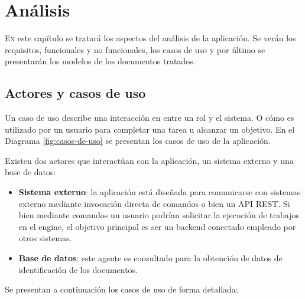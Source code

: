 
\chapter{Análisis}
\label{chap:analisis}

\lettrine{E}{n} este capítulo se tratará los aspectos del análisis de la aplicación. Se verán los requisitos, funcionales y no funcionales, los casos de uso y por último se presentarán los modelos de los documentos tratados.

\section{Actores y casos de uso}

Un caso de uso describe una interacción en entre un rol y el sistema. O cómo es utilizado por un usuario para completar una tarea u alcanzar un objetivo. En el Diagrama \ref{fig:casos-de-uso} se presentan los casos de uso de la aplicación. 

Existen dos actores que interactúan con la aplicación, un sistema externo y una base de datos:

\begin{itemize}
	\item \textbf{Sistema externo}: la aplicación está diseñada para comunicarse con sistemas externo mediante invocación directa de comandos o bien un API REST. Si bien mediante comandos un usuario podrían solicitar la ejecución de trabajos en el engine, el objetivo principal es ser un backend conectado empleado por otros sistemas.
	\item \textbf{Base de datos}: este agente es consultado para la obtención de datos de identificación de los documentos.
\end{itemize}

Se presentan a continuación los casos de uso de forma detallada:

